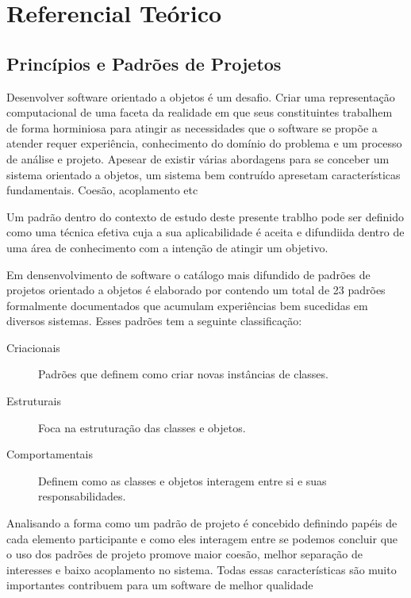 \chapter{Referencial Teórico}

\section{Princípios e Padrões de Projetos}

Desenvolver software orientado a objetos é um desafio. Criar uma representação
computacional de uma faceta da realidade em que seus constituintes trabalhem de
forma horminiosa para atingir as necessidades que o software se propõe a
atender requer experiência, conhecimento do domínio do problema e um processo de
análise e projeto. Apesear de existir várias abordagens para se conceber um
sistema orientado a objetos\cite{evans2004ddd},\cite{gomma11} um sistema bem
contruído apresetam características fundamentais. Coesão, acoplamento etc

Um padrão dentro do contexto de estudo deste presente trablho pode ser definido
como uma técnica efetiva cuja a sua aplicabilidade é aceita e difundiida dentro
de uma área de conhecimento com a intenção de atingir um
objetivo\cite{MetskerWake06}.

Em densenvolvimento de software o catálogo mais difundido de padrões de projetos
orientado a objetos é elaborado por  contendo um total de 23
padrões formalmente documentados que acumulam experiências bem sucedidas em
diversos sistemas. Esses padrões tem a seguinte classificação:

\begin{description}
\item[Criacionais] Padrões que definem como criar novas instâncias de classes.
\item[Estruturais] Foca na estruturação das classes e objetos.
\item[Comportamentais] Definem como as classes e objetos interagem entre si e
suas responsabilidades.
\end{description}



Analisando a forma como um padrão de projeto é concebido definindo papéis de
cada elemento participante e como eles interagem entre se podemos concluir que
o uso dos padrões de projeto promove maior coesão, melhor separação de
interesses e baixo acoplamento no sistema. Todas essas características são muito
importantes contribuem para um software de melhor qualidade


